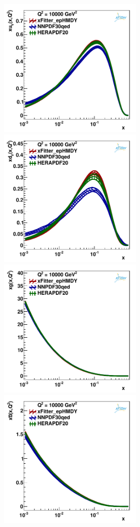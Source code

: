\begin{figure}
\includegraphics[width=7cm]{plots/uv_10000.pdf} 
\includegraphics[width=7cm]{plots/dv_10000.pdf} 
\includegraphics[width=7cm]{plots/gluon_10000.pdf} 
\includegraphics[width=7cm]{plots/ubar_10000.pdf} 

\end{figure}
